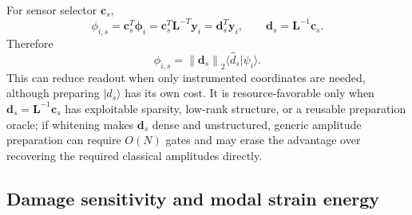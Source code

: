 \documentclass{ieeeaccess}
\newcommand{\ph}{\boldsymbol{\phi}}
\newcommand{\yy}{\mathbf{y}}
\newcommand{\norm}[1]{\left\lVert #1\right\rVert}
\begin{document}
For sensor selector $\mathbf c_s$,
\begin{equation}
\phi_{i,s}=\mathbf c_s^T\ph_i
=\mathbf c_s^T\mathbf L^{-T}\yy_i
=\mathbf d_s^T\yy_i,
\qquad \mathbf d_s=\mathbf L^{-1}\mathbf c_s.
\label{eq:sensor}
\end{equation}
Therefore
\begin{equation}
\phi_{i,s}=\norm{\mathbf d_s}_2\langle\widehat d_s|\psi_i\rangle.
\label{eq:sensoroverlap}
\end{equation}
This can reduce readout when only instrumented coordinates are needed, although preparing $|\widehat d_s\rangle$ has its own cost. It is resource-favorable only when $\mathbf d_s=\mathbf L^{-1}\mathbf c_s$ has exploitable sparsity, low-rank structure, or a reusable preparation oracle; if whitening makes $\mathbf d_s$ dense and unstructured, generic amplitude preparation can require $O(N)$ gates and may erase the advantage over recovering the required classical amplitudes directly.

\subsection{Damage sensitivity and modal strain energy}
\end{document}
